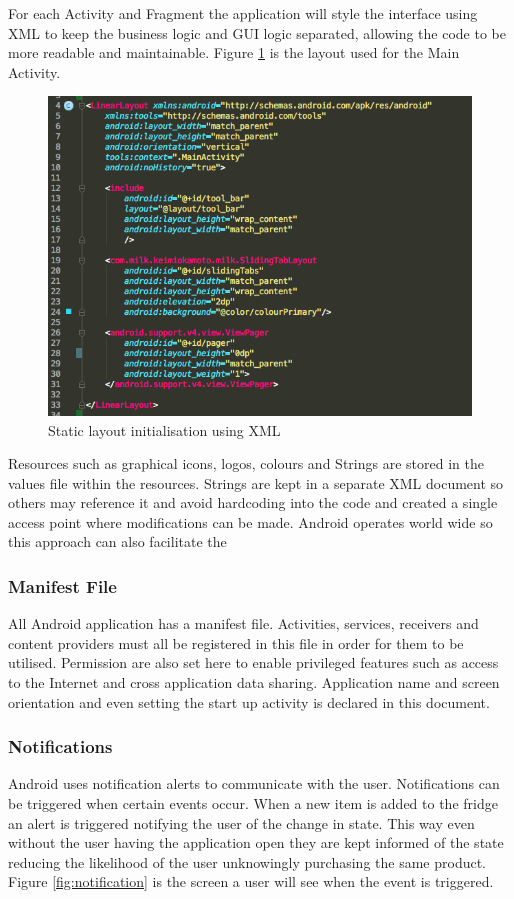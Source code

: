 \documentclass[a4paper, 11pt]{article}
\begin{document}
For each Activity and Fragment the application will style the interface using XML to keep the business logic and GUI logic separated, allowing the code to be more readable and maintainable. Figure \ref{fig:xml} is the layout used for the Main Activity. 

\begin{figure}[!htbp]
\centering
\includegraphics[width=\textwidth]{xml}
\caption{Static layout initialisation using XML} \label{fig:xml}
\end{figure}


Resources such as graphical icons, logos, colours and Strings are stored in the values file within the resources. Strings are kept in a separate XML document so others may reference it and avoid hardcoding into the code and created a single access point where modifications can be made. Android operates world wide so this approach can also facilitate the 

\subsubsection{Manifest File}
All Android application has a manifest file. Activities, services, receivers and content providers must all be registered in this file in order for them to be utilised. Permission are also set here to enable privileged features such as access to the Internet and cross application data sharing. Application name and screen orientation and even setting the start up activity is declared in this document.

\subsubsection{Notifications}
Android uses notification alerts to communicate with the user. Notifications can be triggered when certain events occur. When a new item is added to the fridge an alert is triggered notifying the user of the change in state. This way even without the user having the application open they are kept informed of the state reducing the likelihood of the user unknowingly purchasing the same product. Figure \ref{fig:notification} is the screen a user will see when the event is triggered.
\end{document}
